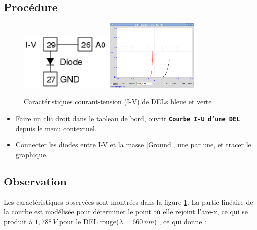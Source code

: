 \documentclass{book}
\newcommand{\nop}{}
\begin{document}
\subsection{Procédure}


\begin{figure}[h!]
\begin{center}
\caption{\label{fig:LED-IV-char}Caractéristiques courant-tension (I-V) de DELs bleue et verte }\vspace{0.5em}
\includegraphics[width=0.4\textwidth, height=0.3\textwidth, keepaspectratio]{Schematic-diode-iv.png}
\includegraphics[width=0.4\textwidth, height=0.3\textwidth, keepaspectratio]{Pic-diode-LED-iv.png}
\end{center}
\end{figure}



\begin{itemize}
  \item Faire un clic droit dans le tableau de bord, ouvrir  \texttt{\textbf{Courbe I-U d'une DEL}\nop} depuis le menu contextuel.
  \item Connecter les diodes entre I-V et la masse [Ground], une par une, et tracer le graphique.
\end{itemize}

\subsection{Observation}


Les caractéristiques observées sont montrées dans la figure  \ref{fig:LED-IV-char}. La partie linéaire de la courbe est modélisée pour déterminer le point où elle rejoint l'axe-x, ce qui se produit à $1,788\ V$ pour le DEL rouge($\lambda=660\, nm$) , ce qui donne :
\end{document}
